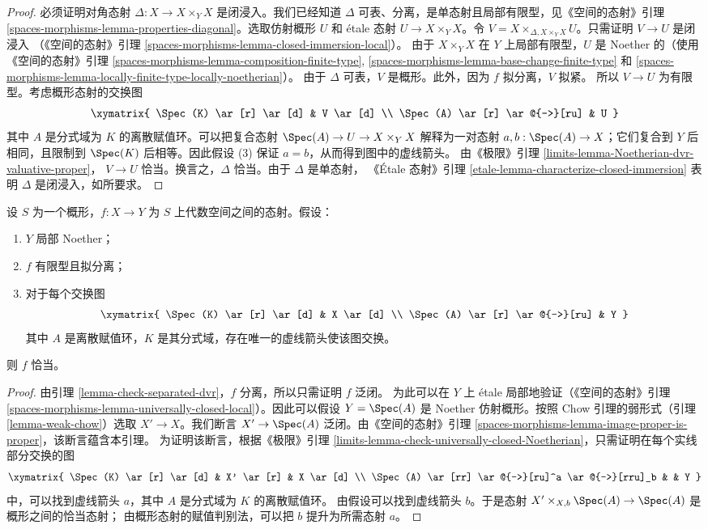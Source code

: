 \begin{proof}
必须证明对角态射 $\Delta : X \to X \times_Y X$ 是闭浸入。我们已经知道
$\Delta$ 可表、分离，是单态射且局部有限型，见《空间的态射》引理
\ref{spaces-morphisms-lemma-properties-diagonal}。选取仿射概形 $U$ 和
\'etale 态射 $U \to X \times_Y X$。令
$V = X \times_{\Delta, X \times_Y X} U$。只需证明 $V \to U$ 是闭浸入
（《空间的态射》引理 \ref{spaces-morphisms-lemma-closed-immersion-local}）。
由于 $X \times_Y X$ 在 $Y$ 上局部有限型，$U$ 是 Noether 的（使用
《空间的态射》引理
\ref{spaces-morphisms-lemma-composition-finite-type},
\ref{spaces-morphisms-lemma-base-change-finite-type} 和
\ref{spaces-morphisms-lemma-locally-finite-type-locally-noetherian}）。
由于 $\Delta$ 可表，$V$ 是概形。此外，因为 $f$ 拟分离，$V$ 拟紧。
所以 $V \to U$ 为有限型。考虑概形态射的交换图
$$
\xymatrix{
\Spec(K) \ar[r] \ar[d] & V \ar[d] \\
\Spec(A) \ar[r] \ar@{-->}[ru] & U
}
$$
其中 $A$ 是分式域为 $K$ 的离散赋值环。可以把复合态射
$\Spec(A) \to U \to X \times_Y X$ 解释为一对态射
$a, b : \Spec(A) \to X$；它们复合到 $Y$ 后相同，且限制到
$\Spec(K)$ 后相等。因此假设 (3) 保证 $a = b$，从而得到图中的虚线箭头。
由《极限》引理 \ref{limits-lemma-Noetherian-dvr-valuative-proper}，
$V \to U$ 恰当。换言之，$\Delta$ 恰当。由于 $\Delta$ 是单态射，
《\'Etale 态射》引理 \ref{etale-lemma-characterize-closed-immersion}
表明 $\Delta$ 是闭浸入，如所要求。
\end{proof}

\begin{lemma}
\label{lemma-check-proper-dvr}
设 $S$ 为一个概形，$f : X \to Y$ 为 $S$ 上代数空间之间的态射。假设：
\begin{enumerate}
\item $Y$ 局部 Noether；
\item $f$ 有限型且拟分离；
\item 对于每个交换图
$$
\xymatrix{
\Spec(K) \ar[r] \ar[d] & X \ar[d] \\
\Spec(A) \ar[r] \ar@{-->}[ru] & Y
}
$$
其中 $A$ 是离散赋值环，$K$ 是其分式域，存在唯一的虚线箭头使该图交换。
\end{enumerate}
则 $f$ 恰当。
\end{lemma}

\begin{proof}
由引理 \ref{lemma-check-separated-dvr}，$f$ 分离，所以只需证明 $f$ 泛闭。
为此可以在 $Y$ 上 \'etale 局部地验证（《空间的态射》引理
\ref{spaces-morphisms-lemma-universally-closed-local}）。因此可以假设
$Y = \Spec(A)$ 是 Noether 仿射概形。按照 Chow 引理的弱形式（引理
\ref{lemma-weak-chow}）选取 $X' \to X$。我们断言
$X' \to \Spec(A)$ 泛闭。由《空间的态射》引理
\ref{spaces-morphisms-lemma-image-proper-is-proper}，该断言蕴含本引理。
为证明该断言，根据《极限》引理
\ref{limits-lemma-check-universally-closed-Noetherian}，只需证明在每个实线
部分交换的图
$$
\xymatrix{
\Spec(K) \ar[r] \ar[d] & X' \ar[r] & X \ar[d] \\
\Spec(A) \ar[rr] \ar@{-->}[ru]^a \ar@{-->}[rru]_b & & Y
}
$$
中，可以找到虚线箭头 $a$，其中 $A$ 是分式域为 $K$ 的离散赋值环。
由假设可以找到虚线箭头 $b$。于是态射
$X' \times_{X, b} \Spec(A) \to \Spec(A)$ 是概形之间的恰当态射；
由概形态射的赋值判别法，可以把 $b$ 提升为所需态射 $a$。
\end{proof}

